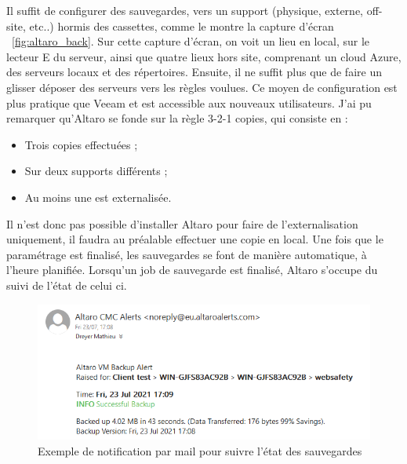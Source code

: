 \documentclass[pfe]{tnreport} %
\begin{document}
Il suffit de configurer des sauvegardes, vers un support (physique, externe, off-site, etc..) hormis des cassettes, comme le montre la capture d'écran ~\ref{fig:altaro_back}. \newline
Sur cette capture d'écran, on voit un lieu en local, sur le lecteur E du serveur, ainsi que quatre lieux hors site, comprenant un cloud Azure, des serveurs locaux et des répertoires. \newline
Ensuite, il ne suffit plus que de faire un glisser déposer des serveurs vers les règles voulues.\newline
Ce moyen de configuration est plus pratique que Veeam et est accessible aux nouveaux utilisateurs. \newline
J'ai pu remarquer qu'Altaro se fonde sur la règle 3-2-1 copies, qui consiste en : \newline
\begin{itemize}
 \item Trois copies effectuées ;
 \item Sur deux supports différents ;
 \item Au moins une est externalisée. \newline 
\end{itemize}
Il n'est donc pas possible d'installer Altaro pour faire de l'externalisation uniquement, il faudra au préalable effectuer une copie en local. \newline
Une fois que le paramétrage est finalisé, les sauvegardes se font de manière automatique, à l'heure planifiée. Lorsqu'un job de sauvegarde est finalisé, Altaro s'occupe du suivi de l'état de celui ci. \newline
\begin{figure}[ht]
 \centering
 \includegraphics[width=12cm]{figures/mail altaro.png}
 \caption{Exemple de notification par mail pour suivre l'état des sauvegardes}
 \label{fig:altaro mail}
\end{figure}
\end{document}

